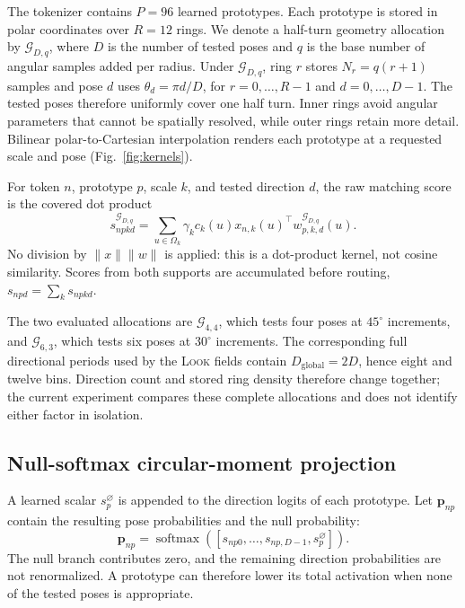 \documentclass[10pt]{article}
\newcommand{\look}{\textsc{Look}}
\newcommand{\geom}[2]{\ensuremath{\mathcal{G}_{#1,#2}}}
\begin{document}
The tokenizer contains $P=96$ learned prototypes. Each prototype is stored in
polar coordinates over $R=12$ rings. We denote a half-turn geometry allocation
by \geom{D}{q}, where $D$ is the number of tested poses and $q$ is the base
number of angular samples added per radius. Under \geom{D}{q}, ring $r$ stores
$N_r=q(r+1)$ samples and pose $d$ uses $\theta_d=\pi d/D$, for
$r=0,\ldots,R-1$ and $d=0,\ldots,D-1$. The tested poses therefore uniformly
cover one half turn. Inner rings avoid angular parameters that cannot be
spatially resolved, while outer rings retain more detail. Bilinear
polar-to-Cartesian interpolation renders each prototype at a requested scale
and pose (Fig.~\ref{fig:kernels}).

For token $n$, prototype $p$, scale $k$, and tested direction $d$, the raw
matching score is the covered dot product
\begin{equation}
 s_{npkd}^{\geom{D}{q}}=\sum_{u\in\Omega_k}\gamma_k c_k(u)
 x_{n,k}(u)^\top w_{p,k,d}^{\geom{D}{q}}(u).
 \label{eq:match}
\end{equation}
No division by $\lVert x\rVert\lVert w\rVert$ is applied: this is a
dot-product kernel, not cosine similarity. Scores from both supports are
accumulated before routing, $s_{npd}=\sum_k s_{npkd}$.

The two evaluated allocations are \geom{4}{4}, which tests four poses at
$45^\circ$ increments, and \geom{6}{3}, which tests six poses at $30^\circ$
increments. The corresponding full directional periods used by the \look{}
fields contain $D_{\mathrm{global}}=2D$, hence eight and twelve bins. Direction
count and stored ring density therefore change together; the current experiment
compares these complete allocations and does not identify either factor in
isolation.

\subsection{Null-softmax circular-moment projection}

A learned scalar $s_p^{\varnothing}$ is appended to the direction logits of
each prototype. Let $\mathbf p_{np}$ contain the resulting pose probabilities
and the null probability:
\begin{equation}
 \mathbf p_{np}=\operatorname{softmax}(
 [s_{np0},\ldots,s_{np,D-1},s_p^{\varnothing}]).
 \label{eq:null}
\end{equation}
The null branch contributes zero, and the remaining direction probabilities
are not renormalized. A prototype can therefore lower its total activation
when none of the tested poses is appropriate.
\end{document}
